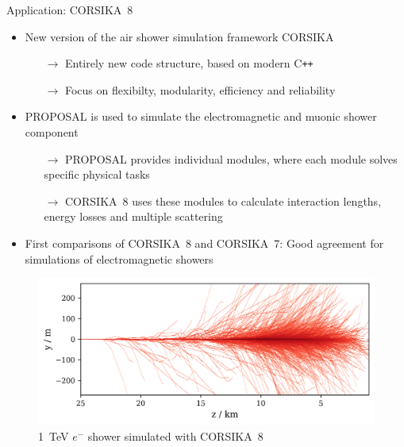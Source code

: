 \documentclass[t]{beamer}
\newlength{\thirdtextwidth}
\newlength{\itemseparation}
\begin{document}
  \begin{columns}[onlytextwidth]%
    \begin{column}{\thirdtextwidth}%
      \begin{block}[equal height group=B]{Application: CORSIKA~8}%
              \begin{itemize}
                \setlength\itemsep{\itemseparation}
                \item New version of the air shower simulation framework CORSIKA
                \begin{itemize}
                  \setlength\itemsep{\itemseparation}
                  \item[$\rightarrow$] Entirely new code structure, based on modern C\texttt{++} 
                  \item[$\rightarrow$] Focus on flexibilty, modularity, efficiency and reliability \cite{Engel2018}
                \end{itemize}
                \item PROPOSAL is used to simulate the electromagnetic and muonic shower component
                \begin{itemize}
                  \setlength\itemsep{\itemseparation}
                  \item[$\rightarrow$] PROPOSAL provides individual modules, where each module solves specific physical tasks \cite{Alameddine_2020}
                  \item[$\rightarrow$] CORSIKA~8 uses these modules to calculate interaction lengths, energy losses and multiple scattering 
                \end{itemize}
                \item First comparisons of CORSIKA~8 and CORSIKA~7: Good agreement for simulations of electromagnetic showers \cite{Alameddine:2021iq}
              \end{itemize}

        \vspace{0.5em}

              \begin{figure}
                \centering
                \includegraphics[width=0.8\linewidth, height=.4\textheight, keepaspectratio]{plots/shower_horizonal.png}
                \caption*{\SI{1}{\tera\electronvolt} $e^-$ shower simulated with CORSIKA~8}
              \end{figure}


\end{block}
\end{column}
\end{columns}
\end{document}
